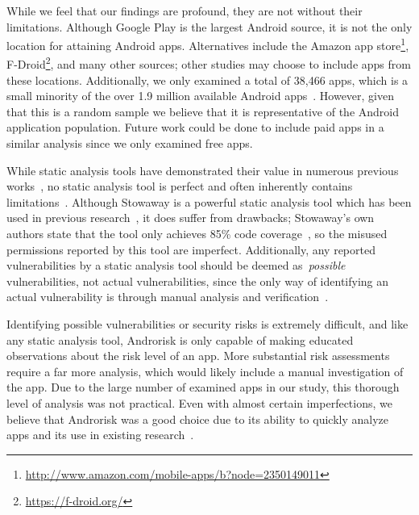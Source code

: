 \documentclass{sig-alternate-05-2015}
\begin{document}
%






While we feel that our findings are profound, they are not without their limitations. Although Google Play is the largest Android source, it is not the only location for attaining Android apps. Alternatives include the Amazon app store\footnote{\url{http://www.amazon.com/mobile-apps/b?node=2350149011}}, F-Droid\footnote{\url{https://f-droid.org/}}, and many other sources; other studies may choose to include apps from these locations. Additionally, we only examined a total of 38,466 apps, which is a small minority of the over 1.9 million available Android apps~\cite{appbrain_stats_url}. However, given that this is a random sample we believe that it is representative of the Android application population. Future work could be done to include paid apps in a similar analysis since we only examined free apps.

While static analysis tools have demonstrated their value in numerous previous works~\cite{Felt:2011:APD:2046707.2046779, Pearce:2012:APS:2414456.2414498}, no static analysis tool is perfect and often inherently contains limitations~\cite{chess2004static}. Although Stowaway is a powerful static analysis tool which has been used in previous research~\cite{Pearce:2012:APS:2414456.2414498,Stevens_investigatinguser,jeon2011dr}, it does suffer from drawbacks; Stowaway's own authors state that the tool only achieves 85\% code coverage~\cite{Felt:2011:APD:2046707.2046779}, so the misused permissions reported by this tool are imperfect. Additionally, any reported vulnerabilities by a static analysis tool should be deemed as~\emph{possible} vulnerabilities, not actual vulnerabilities, since the only way of identifying an actual vulnerability is through manual analysis and verification~\cite{chess2004static}.



Identifying possible vulnerabilities or security risks is extremely difficult, and like any static analysis tool, Androrisk is only capable of making educated observations about the risk level of an app. More substantial risk assessments require a far more analysis, which would likely include a manual investigation of the app. Due to the large number of examined apps in our study, this thorough level of analysis was not practical. Even with almost certain imperfections, we believe that Androrisk was a good choice due to its ability to quickly analyze apps and its use in existing research~\cite{krutz2015dataset}.
\end{document}
